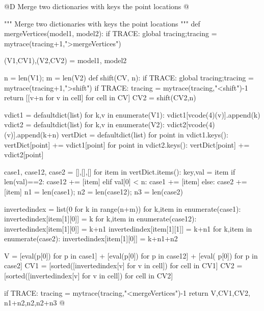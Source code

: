 \documentclass[11pt,oneside]{article}	%
\begin{document}
@D Merge two dictionaries with keys the point locations
@{""" Merge two dictionaries with keys the point locations """
def mergeVertices(model1, model2):
	if TRACE: global tracing;tracing = mytrace(tracing+1,">mergeVertices")

	(V1,CV1),(V2,CV2) = model1, model2

	n = len(V1); m = len(V2)
	def shift(CV, n): 
		if TRACE: global tracing;tracing = mytrace(tracing+1,">shift")
		if TRACE: tracing = mytrace(tracing,"<shift")-1
		return [[v+n for v in cell] for cell in CV]
	CV2 = shift(CV2,n)

	vdict1 = defaultdict(list)
	for k,v in enumerate(V1): vdict1[vcode(4)(v)].append(k) 
	vdict2 = defaultdict(list)
	for k,v in enumerate(V2): vdict2[vcode(4)(v)].append(k+n) 
	vertDict = defaultdict(list)
	for point in vdict1.keys(): vertDict[point] += vdict1[point]
	for point in vdict2.keys(): vertDict[point] += vdict2[point]

	case1, case12, case2 = [],[],[]
	for item in vertDict.items():
		key,val = item
		if len(val)==2:  case12 += [item]
		elif val[0] < n: case1 += [item]
		else: case2 += [item]
	n1 = len(case1); n2 = len(case12); n3 = len(case2)

	invertedindex = list(0 for k in range(n+m))
	for k,item in enumerate(case1):
		invertedindex[item[1][0]] = k
	for k,item in enumerate(case12):
		invertedindex[item[1][0]] = k+n1
		invertedindex[item[1][1]] = k+n1
	for k,item in enumerate(case2):
		invertedindex[item[1][0]] = k+n1+n2

	V = [eval(p[0]) for p in case1] + [eval(p[0]) for p in case12] + [eval(
				p[0]) for p in case2]
	CV1 = [sorted([invertedindex[v] for v in cell]) for cell in CV1]
	CV2 = [sorted([invertedindex[v] for v in cell]) for cell in CV2]


	if TRACE: tracing = mytrace(tracing,"<mergeVertices")-1
	return V,CV1,CV2, n1+n2,n2,n2+n3
@}
\end{document}
